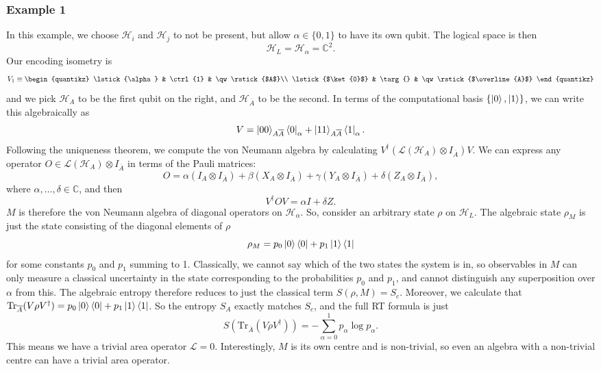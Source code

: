 \documentclass[12pt,a4paper]{report}
\numberwithin{equation}{section}
\newcommand{\ketbra}[2]{\ket{#1}\bra{#2}}
\newcommand{\ketbras}[1]{\ketbra{#1}{#1}}
\newcommand{\ol}[1]{\overline{#1}}
\newcommand{\tr}{\text{Tr}}
\theoremstyle{definition}
\theoremstyle{theorem}
\theoremstyle{theorem}
\theoremstyle{example}
\theoremstyle{definition}
\begin{document}
\subsubsection{Example 1}
In this example, we choose $\mathcal{H}_{i}$ and $\mathcal{H}_{j}$ to not be present, but allow $\alpha\in\{0,1\}$ to have its own qubit. The logical space is then
\begin{equation}
	\mathcal{H}_{L}=\mathcal{H}_{\alpha}=\mathbb{C}^{2}.
\end{equation}
Our encoding isometry is
\begin{equation}
	V_{1}\equiv
			\begin{quantikz}
			\lstick{\alpha} & \ctrl{1} & \qw\rstick{$A$}\\
			\lstick{$\ket{0}$} & \targ{} & \qw\rstick{$\ol{A}$}
			\end{quantikz}
\end{equation}
and we pick $\mathcal{H}_{A}$ to be the first qubit on the right, and $\mathcal{H}_{\ol{A}}$ to be the second. In terms of the computational basis $\{\ket{0},\ket{1}\}$, we can write this algebraically as
\begin{equation}
	V=\ket{00}_{A\ol{A}}\bra{0}_{\alpha}+\ket{11}_{A\ol{A}}\bra{1}_{\alpha}.
\end{equation}
Following the uniqueness theorem, we compute the von Neumann algebra by calculating $V^{\dagger}(\mathcal{L}(\mathcal{H}_{A})\otimes I_{\ol{A}})V$. We can express any operator $O\in\mathcal{L}(\mathcal{H}_{A})\otimes I_{\ol{A}}$ in terms of the Pauli matrices:
\begin{equation}
	O=\alpha(I_{A}\otimes I_{\ol{A}})+\beta(X_{A}\otimes I_{\ol{A}})+\gamma(Y_{A}\otimes I_{\ol{A}})+\delta(Z_{A}\otimes I_{\ol{A}}),
\end{equation}
where $\alpha,\ldots,\delta\in\mathbb{C}$, and then
\begin{equation}
	V^{\dagger}OV=\alpha I+\delta Z.
\end{equation}
$M$ is therefore the von Neumann algebra of diagonal operators on $\mathcal{H}_{\alpha}$. So, consider an arbitrary state $\rho$ on $\mathcal{H}_{L}$. The algebraic state $\rho_{M}$ is just the state consisting of the diagonal elements of $\rho$
\begin{equation}
	\rho_{M}=p_{0}\ketbras{0}+p_{1}\ketbras{1}
\end{equation}
for some constants $p_{0}$ and $p_{1}$ summing to 1. Classically, we cannot say which of the two states the system is in, so observables in $M$ can only measure a classical uncertainty in the state corresponding to the probabilities $p_{0}$ and $p_{1}$, and cannot distinguish any superposition over $\alpha$ from this. The algebraic entropy therefore reduces to just the classical term $S(\rho,M)=S_{c}$. Moreover, we calculate that $\tr_{\ol{A}}(V\rho V^{\dagger})=p_{0}\ketbras{0}+p_{1}\ketbras{1}$. So the entropy $S_{A}$ exactly matches $S_{c}$, and the full RT formula is just
\begin{equation}
	S(\tr_{\ol{A}}(V\rho V^{\dagger}))=-\sum_{\alpha=0}^{1}p_{\alpha}\log{p_{\alpha}}.
\end{equation}
This means we have a trivial area operator $\mathcal{L}=0$. Interestingly, $M$ is its own centre and is non-trivial, so even an algebra with a non-trivial centre can have a trivial area operator.
\end{document}

